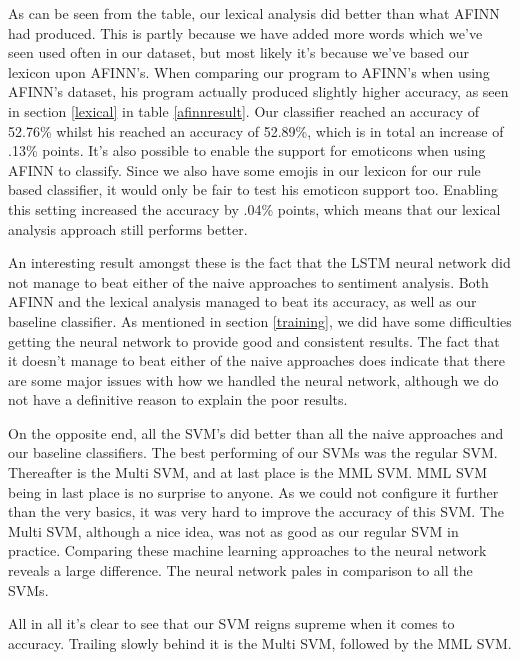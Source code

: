 As can be seen from the table, our lexical analysis did better than what AFINN had produced. This is partly because we have added more words which we've seen used often in our dataset, but most likely it's because we've based our lexicon upon AFINN's. When comparing our program to AFINN's when using AFINN's dataset, his program actually produced slightly higher accuracy, as seen in section \ref{lexical} in table \ref{afinnresult}. Our classifier reached an accuracy of 52.76\% whilst his reached an accuracy of 52.89\%, which is in total an increase of .13\% points. It's also possible to enable the support for emoticons when using AFINN to classify. Since we also have some emojis in our lexicon for our rule based classifier, it would only be fair to test his emoticon support too. Enabling this setting increased the accuracy by .04\% points, which means that our lexical analysis approach still performs better.

An interesting result amongst these is the fact that the LSTM neural network did not manage to beat either of the naive approaches to sentiment analysis. Both AFINN and the lexical analysis managed to beat its accuracy, as well as our baseline classifier. As mentioned in section \ref{training}, we did have some difficulties getting the neural network to provide good and consistent results. The fact that it doesn't manage to beat either of the naive approaches does indicate that there are some major issues with how we handled the neural network, although we do not have a definitive reason to explain the poor results.

On the opposite end, all the SVM's did better than all the naive approaches and our baseline classifiers. The best performing of our SVMs was the regular SVM. Thereafter is the Multi SVM, and at last place is the MML SVM. MML SVM being in last place is no surprise to anyone. As we could not configure it further than the very basics, it was very hard to improve the accuracy of this SVM. The Multi SVM, although a nice idea, was not as good as our regular SVM in practice. Comparing these machine learning approaches to the neural network reveals a large difference. The neural network pales in comparison to all the SVMs. 

All in all it's clear to see that our SVM reigns supreme when it comes to accuracy. Trailing slowly behind it is the Multi SVM, followed by the MML SVM.


